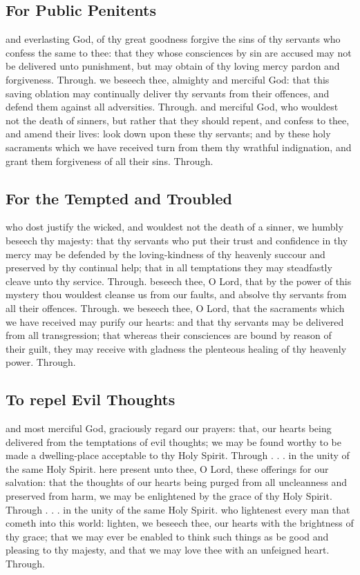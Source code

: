 \begin{multicols}{2}
\subsection{For Public Penitents}
\collect
{} and everlasting God, of thy great goodness forgive the sins of thy servants who confess the same to thee: that they whose consciences by sin are accused may not be delivered unto punishment, but may obtain of thy loving mercy pardon and forgiveness. Through.
\secret
{} we beseech thee, almighty and merciful God: that this saving oblation may continually deliver thy servants from their offences, and defend them against all adversities. Through.
\postcommunion
{} and merciful God, who wouldest not the death of sinners, but rather that they should repent, and confess to thee, and amend their lives: look down upon these thy servants; and by these holy sacraments which we have received turn from them thy wrathful indignation, and grant them forgiveness of all their sins. Through.

\subsection{For the Tempted and Troubled}
\collect
{} who dost justify the wicked, and wouldest not the death of a sinner, we humbly beseech thy majesty: that thy servants who put their trust and confidence in thy mercy may be defended by the loving-kindness of thy heavenly succour and preserved by thy continual help; that in all temptations they may steadfastly cleave unto thy service. Through.
\secret
{} beseech thee, O Lord, that by the power of this mystery thou wouldest cleanse us from our faults, and absolve thy servants from all their offences. Through.
\postcommunion
{} we beseech thee, O Lord, that the sacraments which we have received may purify our hearts: and that thy servants may be delivered from all transgression; that whereas their consciences are bound by reason of their guilt, they may receive with gladness the plenteous healing of thy heavenly power. Through.

\subsection{To repel Evil Thoughts}
\collect
{} and most merciful God, graciously regard our prayers: that, our hearts being delivered from the temptations of evil thoughts; we may be found worthy to be made a dwelling-place acceptable to thy Holy Spirit. Through . . . in the unity of the same Holy Spirit.
\secret
{} here present unto thee, O Lord, these offerings for our salvation: that the thoughts of our hearts being purged from all uncleanness and preserved from harm, we may be enlightened by the grace of thy Holy Spirit. Through . . . in the unity of the same Holy Spirit.
\postcommunion
{} who lightenest every man that cometh into this world: lighten, we beseech thee, our hearts with the brightness of thy grace; that we may ever be enabled to think such things as be good and pleasing to thy majesty, and that we may love thee with an unfeigned heart. Through.


\end{multicols}
